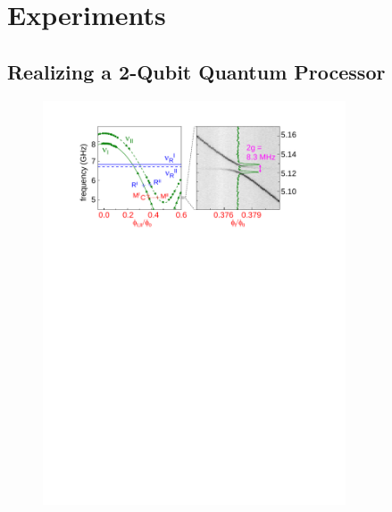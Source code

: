 
\chapter{Experiments}


\section{Realizing a 2-Qubit Quantum Processor}


\begin{figure}
	\centering
		\includegraphics[width=0.8\textwidth]{./material/papers/iswap/figures/2_qubit_processor_spectrocopy}
	\label{fig:ProcessorSpectroscopy}
	\caption{}
\end{figure}


